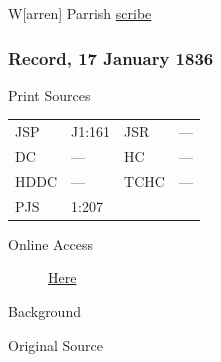 					\begin{tightright}
					W[arren] Parrish \uline{scribe}
					\end{tightright}
					
		\subsubsection{Record, 17 January 1836}
			\label{EMS-1836-JS-17-JAN-1836}
			
			\begin{description}
					\item[Print Sources]
				\end{description}

					\begin{tabular}{p{0.5in}p{1in}p{0.5in}p{1in}}
					JSP	 	& J1:161		& JSR 		& --- \\
					DC	 	& ---				& HC 		& --- \\
					HDDC 	& ---				& TCHC 		& --- \\
					PJS 	& 1:207			& 	 		&  \\
					\end{tabular}
				
				\begin{description}
					\item[Online Access] \href{https://www.josephsmithpapers.org/paper-summary/journal-1835-1836/128}{Here}
				\end{description}
				
				\begin{description}
					\item[Background]
				\end{description}
				
				
				\begin{description}
					\item[Original Source]
				\end{description}
				
				
